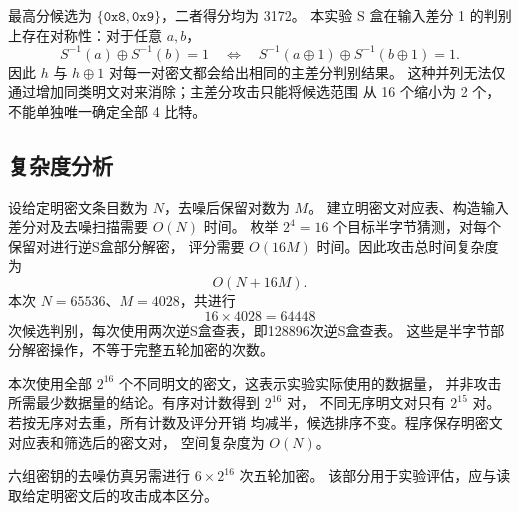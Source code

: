最高分候选为 $\{\texttt{0x8},\texttt{0x9}\}$，二者得分均为 3172。
本实验 S 盒在输入差分 1 的判别上存在对称性：对于任意 $a,b$，
\[
    S^{-1}(a)\oplus S^{-1}(b)=1
    \quad\Longleftrightarrow\quad
    S^{-1}(a\oplus1)\oplus S^{-1}(b\oplus1)=1.
\]
因此 $h$ 与 $h\oplus1$ 对每一对密文都会给出相同的主差分判别结果。
这种并列无法仅通过增加同类明文对来消除；主差分攻击只能将候选范围
从 16 个缩小为 2 个，不能单独唯一确定全部 4 比特。

\subsection{复杂度分析}

设给定明密文条目数为 $N$，去噪后保留对数为 $M$。
建立明密文对应表、构造输入差分对及去噪扫描需要 $O(N)$ 时间。
枚举 $2^4=16$ 个目标半字节猜测，对每个保留对进行逆S盒部分解密，
评分需要 $O(16M)$ 时间。因此攻击总时间复杂度为
\[
    O(N+16M).
\]
本次 $N=65536$、$M=4028$，共进行
\[
    16\times4028=64448
\]
次候选判别，每次使用两次逆S盒查表，即128896次逆S盒查表。
这些是半字节部分解密操作，不等于完整五轮加密的次数。

本次使用全部 $2^{16}$ 个不同明文的密文，这表示实验实际使用的数据量，
并非攻击所需最少数据量的结论。有序对计数得到 $2^{16}$ 对，
不同无序明文对只有 $2^{15}$ 对。若按无序对去重，所有计数及评分开销
均减半，候选排序不变。程序保存明密文对应表和筛选后的密文对，
空间复杂度为 $O(N)$。

六组密钥的去噪仿真另需进行 $6\times2^{16}$ 次五轮加密。
该部分用于实验评估，应与读取给定明密文后的攻击成本区分。


